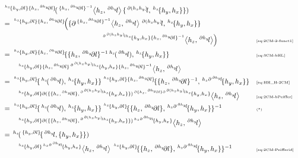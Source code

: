 \documentclass[11pt, reqno]{amsart} %
\newcommand{\act}[1]{\,\sp{#1}\!}
\theoremstyle{definition}
\theoremstyle{remark}
\numberwithin{equation}{section}
\begin{document}
\begin{align*}
  &\act{\act{h_z}\{h_y,\partial l\}\{h_z,\act{\partial h_y}\partial l\}}(\act{\{h_z,\act{\partial h_y}\partial l\}^{-1}}\left<h_z,\act{\partial h_y}l\right>\{\act{\partial (h_zh_y)}l,\act{h_z}\{h_y,h_x\}\}) \\
  &= \act{\act{h_z}\{h_y,\partial l\}\{h_z,\act{\partial h_y}\partial l\}}\Bigl(\{\partial\act{\{h_z,\act{\partial h_y}\partial l\}^{-1}}\left<h_z,\act{\partial h_y}l\right>\act{\partial (h_zh_y)}l,\act{h_z}\{h_y,h_x\}\} \\
  &\hspace{5cm} \act{\act{\partial \act{\partial (h_zh_y)}lh_z}\{h_y,h_x\}\{h_z,\act{\partial h_y}\partial l\}^{-1}}\left<h_z,\act{\partial h_y}l\right>\Bigr) &&\text{\tiny \eqref{eq:2CM-2-funct1}} \\
  &= \act{\act{h_z}\{h_y,\partial l\}\{h_z,\act{\partial h_y}\partial l\}}\{\{h_z,\act{\partial h_y}\partial l\}^{-1}\act{h_z}(\act{\partial h_y}l),\act{h_z}\{h_y,h_x\}\} &&\text{\tiny \eqref{eq:3CM-bHL}} \\
  &\qquad  \act{\act{h_z}\{h_y,\partial l\}\{h_z,\act{\partial h_y}\partial l\}\act{\partial \act{\partial (h_zh_y)}lh_z}\{h_y,h_x\}\{h_z,\act{\partial h_y}\partial l\}^{-1}}\left<h_z,\act{\partial h_y}l\right> \\
  &= \act{\act{h_z}\{h_y,\partial l\}}\{\act{h_z}(\act{\partial h_y}l),\act{h_z}\{h_y,h_x\}\}\act{\act{h_z}\{h_y,\partial l\}\{h_z,\act{\partial h_y}\partial l\}}\{\{h_z,\act{\partial h_y}\partial l\}^{-1},\act{h_z\partial \act{\partial h_y}l}\{h_y,h_x\}\} &&\text{\tiny \eqref{eq:HH_H-2CM}} \\
  &\qquad  \act{\act{h_z}\{h_y,\partial l\}\partial(\{\{h_z,\act{\partial h_y}\partial l\},\act{\partial \act{\partial (h_zh_y)}lh_z}\{h_y,h_x\}\})\act{\partial \{h_z,\act{\partial h_y}\partial l\}\partial \act{\partial (h_zh_y)}lh_z}\{h_y,h_x\}}\left<h_z,\act{\partial h_y}l\right> & &\text{\tiny \eqref{eq:2CM-bPeiffer}} \\
  &= \act{\act{h_z}\{h_y,\partial l\}}\{\act{h_z}(\act{\partial h_y}l),\act{h_z}\{h_y,h_x\}\}\act{\act{h_z}\{h_y,\partial l\}}\{\{h_z,\act{\partial h_y}\partial l\},\act{h_z\partial \act{\partial h_y}l}\{h_y,h_x\}\}^{-1} &&\text{\tiny (*)} \\
  &\qquad  \act{\act{h_z}\{h_y,\partial l\}\partial(\{\{h_z,\act{\partial h_y}\partial l\},\act{\partial \act{\partial (h_zh_y)}lh_z}\{h_y,h_x\}\})\act{h_z\partial \act{\partial h_y}l}\{h_y,h_x\}}\left<h_z,\act{\partial h_y}l\right> \\
  &= \act{h_z}(\act{\{h_y,\partial l\}}\{\act{\partial h_y}l,\{h_y,h_x\}\}) \\
  &\qquad  \act{\act{h_z}\{h_y,\partial l\}\act{h_z\partial \act{\partial h_y}l}\{h_y,h_x\}}\left<h_z,\act{\partial h_y}l\right>
  \act{\act{h_z}\{h_y,\partial l\}}\{\{h_z,\act{\partial h_y}\partial l\},\act{h_z\partial \act{\partial h_y}l}\{h_y,h_x\}\}^{-1} & &\text{\tiny \eqref{eq:2CM-Peifferid}}
\end{align*}
\end{document}
